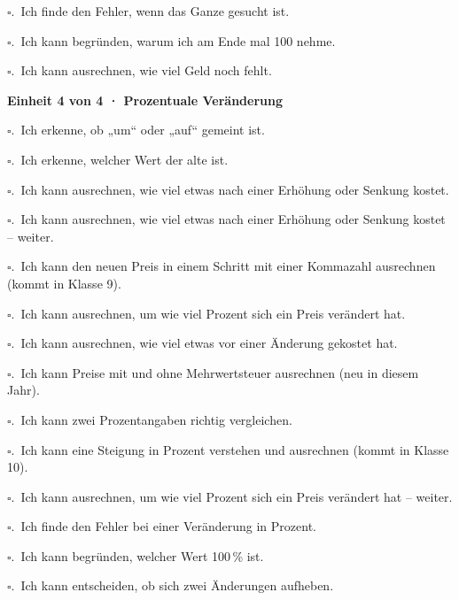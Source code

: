{\noindent$\square$.\ Ich finde den Fehler, wenn das Ganze gesucht ist.\par
\noindent$\square$.\ Ich kann begründen, warum ich am Ende mal 100 nehme.\par
\noindent$\square$.\ Ich kann ausrechnen, wie viel Geld noch fehlt.\par
\par\smallskip\noindent\textbf{Einheit 4 von 4 · Prozentuale Veränderung}\par
\noindent$\square$.\ Ich erkenne, ob „um“ oder „auf“ gemeint ist.\par
\noindent$\square$.\ Ich erkenne, welcher Wert der alte ist.\par
\noindent$\square$.\ Ich kann ausrechnen, wie viel etwas nach einer Erhöhung oder Senkung kostet.\par
\noindent$\square$.\ Ich kann ausrechnen, wie viel etwas nach einer Erhöhung oder Senkung kostet – weiter.\par
\noindent$\square$.\ Ich kann den neuen Preis in einem Schritt mit einer Kommazahl ausrechnen (kommt in Klasse 9).\par
\noindent$\square$.\ Ich kann ausrechnen, um wie viel Prozent sich ein Preis verändert hat.\par
\noindent$\square$.\ Ich kann ausrechnen, wie viel etwas vor einer Änderung gekostet hat.\par
\noindent$\square$.\ Ich kann Preise mit und ohne Mehrwertsteuer ausrechnen (neu in diesem Jahr).\par
\noindent$\square$.\ Ich kann zwei Prozentangaben richtig vergleichen.\par
\noindent$\square$.\ Ich kann eine Steigung in Prozent verstehen und ausrechnen (kommt in Klasse 10).\par
\noindent$\square$.\ Ich kann ausrechnen, um wie viel Prozent sich ein Preis verändert hat – weiter.\par
\noindent$\square$.\ Ich finde den Fehler bei einer Veränderung in Prozent.\par
\noindent$\square$.\ Ich kann begründen, welcher Wert 100\,\% ist.\par
\noindent$\square$.\ Ich kann entscheiden, ob sich zwei Änderungen aufheben.\par
}
